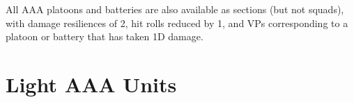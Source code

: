 All AAA platoons and batteries are also available as sections (but not squads), with damage resiliences of 2, hit rolls reduced by 1, and VPs corresponding to a platoon or battery that has taken 1D damage.

%

\section{Light AAA Units}

